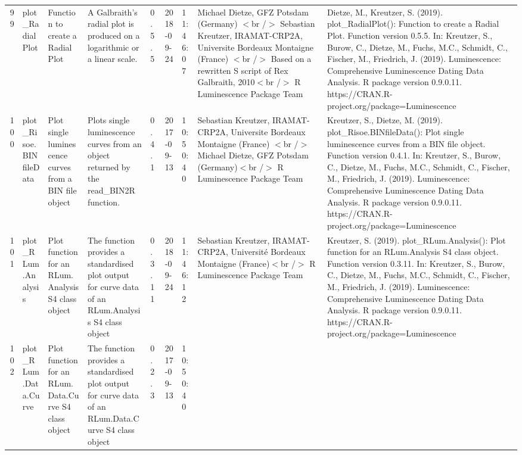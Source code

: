 \begin{table}[ht]
\begin{tabular}{rllllllll}
 \\ 
  99 & plot\_RadialPlot & Function to create a Radial Plot & A Galbraith's radial plot is produced on a logarithmic or a linear scale. & 0.5.5 & 2018-09-24 & 11:46:07
 & Michael Dietze, GFZ Potsdam (Germany) $<$br /$>$ Sebastian Kreutzer, IRAMAT-CRP2A, Universite Bordeaux Montaigne (France) $<$br /$>$ Based on a rewritten S script of Rex Galbraith, 2010$<$br /$>$  R Luminescence Package Team & Dietze, M., Kreutzer, S. (2019). plot\_RadialPlot(): Function to create a Radial Plot. Function version 0.5.5. In: Kreutzer, S., Burow, C., Dietze, M., Fuchs, M.C., Schmidt, C., Fischer, M., Friedrich, J. (2019). Luminescence: Comprehensive Luminescence Dating Data Analysis. R package version 0.9.0.11. https://CRAN.R-project.org/package=Luminescence
 \\ 
  100 & plot\_Risoe.BINfileData & Plot single luminescence curves from a BIN file object & Plots single luminescence curves from an object returned by the read\_BIN2R  function. & 0.4.1 & 2017-09-13 & 10:50:40
 & Sebastian Kreutzer, IRAMAT-CRP2A, Universite Bordeaux Montaigne (France) $<$br /$>$ Michael Dietze, GFZ Potsdam (Germany)$<$br /$>$  R Luminescence Package Team & Kreutzer, S., Dietze, M. (2019). plot\_Risoe.BINfileData(): Plot single luminescence curves from a BIN file object. Function version 0.4.1. In: Kreutzer, S., Burow, C., Dietze, M., Fuchs, M.C., Schmidt, C., Fischer, M., Friedrich, J. (2019). Luminescence: Comprehensive Luminescence Dating Data Analysis. R package version 0.9.0.11. https://CRAN.R-project.org/package=Luminescence
 \\ 
  101 & plot\_RLum.Analysis & Plot function for an RLum.Analysis S4 class object & The function provides a standardised plot output for curve data of an RLum.Analysis S4 class object & 0.3.11 & 2018-09-24 & 11:46:12
 & Sebastian Kreutzer, IRAMAT-CRP2A, Université Bordeaux Montaigne (France)$<$br /$>$  R Luminescence Package Team & Kreutzer, S. (2019). plot\_RLum.Analysis(): Plot function for an RLum.Analysis S4 class object. Function version 0.3.11. In: Kreutzer, S., Burow, C., Dietze, M., Fuchs, M.C., Schmidt, C., Fischer, M., Friedrich, J. (2019). Luminescence: Comprehensive Luminescence Dating Data Analysis. R package version 0.9.0.11. https://CRAN.R-project.org/package=Luminescence
 \\ 
  102 & plot\_RLum.Data.Curve & Plot function for an RLum.Data.Curve S4 class object & The function provides a standardised plot output for curve data of an RLum.Data.Curve S4 class object & 0.2.3 & 2017-09-13 & 10:50:40

\end{tabular}
\end{table}
